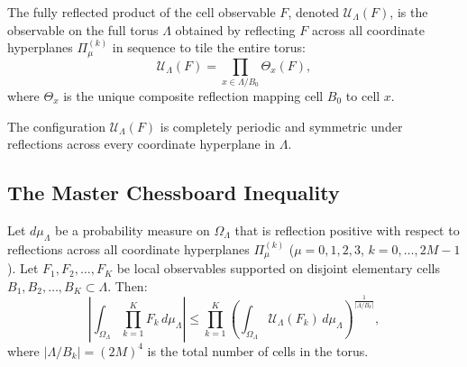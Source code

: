 \begin{definition}
\label{def:fully_reflected_product}
The fully reflected product of the cell observable $F$, denoted $\mathcal{U}_\Lambda(F)$, is the observable on the full torus $\Lambda$ obtained by reflecting $F$ across all coordinate hyperplanes $\Pi_\mu^{(k)}$ in sequence to tile the entire torus:
\begin{equation}
\label{eq:ch11_reflected_product_def}
\mathcal{U}_\Lambda(F) = \prod_{x \in \Lambda / B_0} \Theta_x(F),
\end{equation}
where $\Theta_x$ is the unique composite reflection mapping cell $B_0$ to cell $x$.
\end{definition}

The configuration $\mathcal{U}_\Lambda(F)$ is completely periodic and symmetric under reflections across every coordinate hyperplane in $\Lambda$.

\subsection{The Master Chessboard Inequality}
\label{subsec:master_chessboard_inequality}

\begin{theorem}
\label{thm:chessboard_bound}
Let $d\mu_\Lambda$ be a probability measure on $\Omega_\Lambda$ that is reflection positive with respect to reflections across all coordinate hyperplanes $\Pi_\mu^{(k)}$ ($\mu = 0, 1, 2, 3$, $k = 0, \dots, 2M-1$). Let $F_1, F_2, \dots, F_K$ be local observables supported on disjoint elementary cells $B_1, B_2, \dots, B_K \subset \Lambda$. Then:
\begin{equation}
\label{eq:chessboard_inequality}
\left| \int_{\Omega_\Lambda} \prod_{k=1}^K F_k \, d\mu_\Lambda \right| \le \prod_{k=1}^K \left( \int_{\Omega_\Lambda} \mathcal{U}_\Lambda(F_k) \, d\mu_\Lambda \right)^{\frac{1}{|\Lambda / B_k|}},
\end{equation}
where $|\Lambda / B_k| = (2M)^4$ is the total number of cells in the torus.
\end{theorem}

